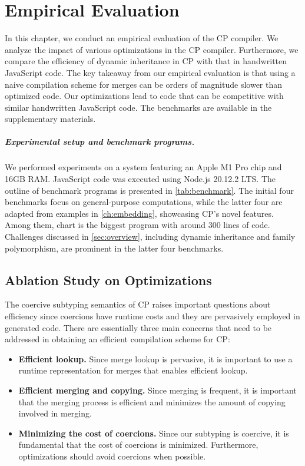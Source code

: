 \chapter{Empirical Evaluation} \label{ch:empirical}

In this chapter, we conduct an empirical evaluation of the CP compiler. We
analyze the impact of various optimizations in the CP compiler. Furthermore, we
compare the efficiency of dynamic inheritance in CP with that in handwritten
JavaScript code. The key takeaway from our empirical evaluation is that using a
naive compilation scheme for merges can be orders of magnitude slower than
optimized code. Our optimizations lead to code that can be competitive with
similar handwritten JavaScript code. The benchmarks are available in the
supplementary materials.

\paragraph{Experimental setup and benchmark programs.}
We performed experiments on a system featuring an Apple M1 Pro chip and 16GB
RAM. JavaScript code was executed using Node.js 20.12.2 LTS. The outline of
benchmark programs is presented in \autoref{tab:benchmark}. The initial four
benchmarks focus on general-purpose computations, while the latter four are
adapted from examples in \autoref{ch:embedding}, showcasing CP's novel features.
Among them, \textsf{chart} is the biggest program with around 300 lines of code.
Challenges discussed in \autoref{sec:overview}, including dynamic inheritance
and family polymorphism, are prominent in the latter four benchmarks.

\section{Ablation Study on Optimizations} \label{sec:optimization}

The coercive subtyping semantics of CP raises important questions about
efficiency since coercions have runtime costs and they are pervasively employed
in generated code. There are essentially three main concerns that need to be
addressed in obtaining an efficient compilation scheme for CP:

\begin{itemize}

\item \textbf{Efficient lookup.} Since merge lookup is pervasive, it is
      important to use a runtime representation for merges that enables
      efficient lookup.

\item \textbf{Efficient merging and copying.} Since merging is frequent, it is
      important that the merging process is efficient and minimizes the amount
      of copying involved in merging.

\item \textbf{Minimizing the cost of coercions.} Since our subtyping is
      coercive, it is fundamental that the cost of coercions is minimized.
      Furthermore, optimizations should avoid coercions when possible.
  
\end{itemize}

